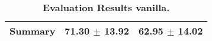 \begin{table}[htb]
{\begin{tabular}{lll}
\midrule
\textbf{Summary                                  } &                  \phantom{0}71.30 $\pm$ 13.92 &                      \phantom{0}62.95 $\pm$ 14.02 \\
\bottomrule
\end{tabular}%
}
\caption{\textbf{Evaluation Results vanilla.}}
\label{tab:eval-results}
\end{table}
